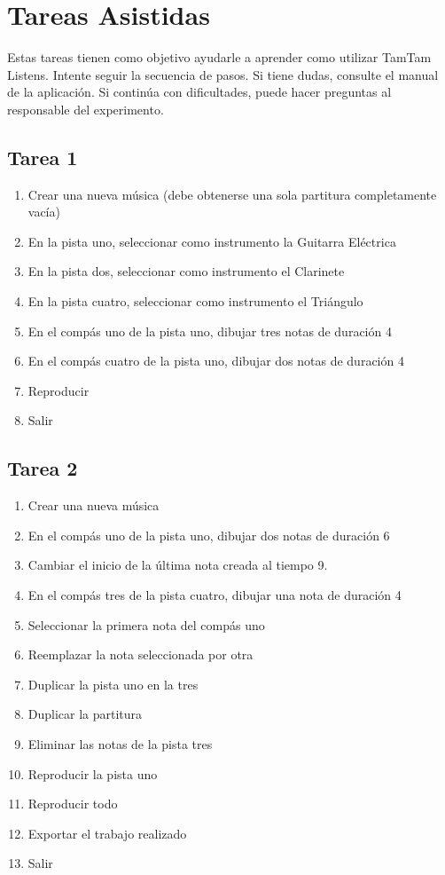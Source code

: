 \section{Tareas Asistidas}

Estas tareas tienen como objetivo ayudarle a aprender como utilizar TamTam Listens.
Intente seguir la secuencia de pasos. Si tiene dudas, consulte el manual de la aplicaci\'on.
Si contin\'ua con dificultades, puede hacer preguntas al responsable del experimento.

\subsection{Tarea 1}
\begin{enumerate}
    \item Crear una nueva m\'usica (debe obtenerse una sola partitura completamente vac\'ia)
    \item En la pista uno, seleccionar como instrumento la Guitarra El\'ectrica
    \item En la pista dos, seleccionar como instrumento el Clarinete
    \item En la pista cuatro, seleccionar como instrumento el Tri\'angulo
    \item En el comp\'as uno de la pista uno, dibujar tres notas de duraci\'on 4
    \item En el comp\'as cuatro de la pista uno, dibujar dos notas de duraci\'on 4
    \item Reproducir
    \item Salir
\end{enumerate}

\subsection{Tarea 2}
\begin{enumerate}
    \item Crear una nueva m\'usica
    \item En el comp\'as uno de la pista uno, dibujar dos notas de duraci\'on 6
    \item Cambiar el inicio de la \'ultima nota creada al tiempo 9.
    \item En el comp\'as tres de la pista cuatro, dibujar una nota de duraci\'on 4
    \item Seleccionar la primera nota del comp\'as uno
    \item Reemplazar la nota seleccionada por otra
    \item Duplicar la pista uno en la tres
    \item Duplicar la partitura
    \item Eliminar las notas de la pista tres
    \item Reproducir la pista uno
    \item Reproducir todo
    \item Exportar el trabajo realizado
    \item Salir
\end{enumerate}

